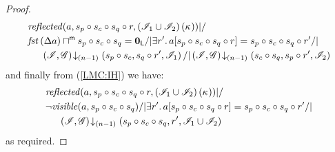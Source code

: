 \begin{lemma}
\begin{proof}
\begin{align*}
	&\m{reflected}(a,s_p \composeL s_c \composeL s_q \composeL r, \left(\lmod_1 \cup \lmod_{2}\right)(\ca{})) |/\null  \\  
  &\fst{\updateFP{a}} \maxMeetL s_p \composeL s_c \composeL s_q = \unitL /| \exsts{r'}a[s_p \composeL s_c \composeL s_q \composeL r] = s_p \composeL s_c \composeL s_q \composeL r' /| \\
  &\hspace{0.5cm}\extendsAMUpto{\lmod, \gmod}{(n-1)}{s_p \composeL s_c}{s_q \composeL r'}{\lmod_{1}} /| 
  \extendsAMUpto{\lmod, \gmod}{(n-1)}{s_c \composeL s_q}{s_p \composeL r'}{\lmod_{2}} 
\end{align*}
and finally from (\ref{LMC:IH}) we have: 
%
\begin{align*}
	&\m{reflected}(a,s_p \composeL s_c \composeL s_q \composeL r, \left(\lmod_1 \cup \lmod_{2}\right)(\ca{})) |/\null  \\  
  &\neg\m{visible}(a, s_p \composeL s_c \composeL s_q) /| \exsts{r'}a[s_p \composeL s_c \composeL s_q \composeL r] = s_p \composeL s_c \composeL s_q \composeL r' /| \\
  &\hspace{0.5cm}\extendsAMUpto{\lmod, \gmod}{(n-1)}{s_p \composeL s_c \composeL s_q}{r'}{\lmod_{1} \cup \lmod_{2}}
\end{align*}
as required. 
%
%
%
%
%

\end{proof}
\end{lemma}
%
%